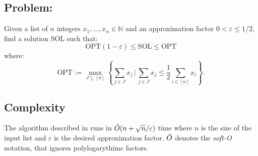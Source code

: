 \subsection{\ApxPartition Problem:}
Given a list of \(n\) integers \(x_1, \ldots, x_n \in \mathbb{N}\) and an approximation factor \(0 < \varepsilon \le 1/2\), find a solution $\text{SOL}$ such that:
\[
    \text{OPT}(1-\varepsilon) \le \text{SOL} \le \text{OPT}
\]
where:
\[
    \text{OPT} := \max_{J \subseteq [n]} \left\{ \sum_{j \in J} x_j \, \bigg| \, \sum_{j \in J} x_j \leq \frac{1}{2} \sum_{i \in [n]} x_i \right\}.
\]

\subsection{Complexity}
The algorithm described in \cite{deng} runs in \(\tilde{O}(n + \sqrt{n}/\varepsilon)\) time where \(n\) is the size of the input list and \(\varepsilon\) is the desired approximation factor. $\tilde{O}$ denotes the \textit{soft-O} notation, that ignores polylogarythimc factors.



